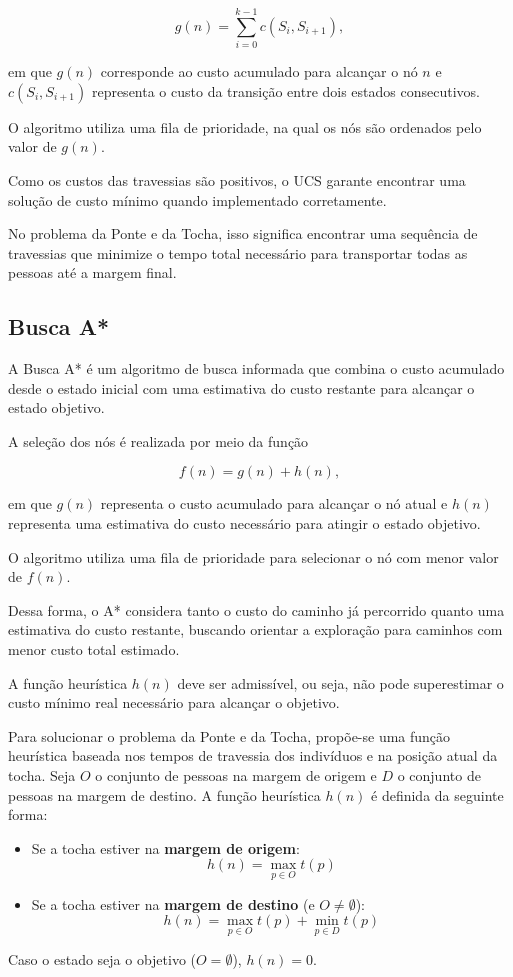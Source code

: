 \documentclass{article}
\begin{document}
\[
g(n)=\sum_{i=0}^{k-1}c(S_i,S_{i+1}),
\]

em que $g(n)$ corresponde ao custo acumulado
para alcançar o nó $n$ e $c(S_i,S_{i+1})$
representa o custo da transição entre dois
estados consecutivos.

O algoritmo utiliza uma fila de prioridade,
na qual os nós são ordenados pelo valor
de $g(n)$.

Como os custos das travessias são positivos,
o UCS garante encontrar uma solução de custo
mínimo quando implementado corretamente.

No problema da Ponte e da Tocha, isso significa
encontrar uma sequência de travessias que minimize
o tempo total necessário para transportar todas
as pessoas até a margem final.

\subsection{Busca A*}

A Busca A* é um algoritmo de busca informada que
combina o custo acumulado desde o estado inicial
com uma estimativa do custo restante para alcançar
o estado objetivo.

A seleção dos nós é realizada por meio da função

\[
f(n)=g(n)+h(n),
\]

em que $g(n)$ representa o custo acumulado para
alcançar o nó atual e $h(n)$ representa uma
estimativa do custo necessário para atingir
o estado objetivo.

O algoritmo utiliza uma fila de prioridade
para selecionar o nó com menor valor de $f(n)$.

Dessa forma, o A* considera tanto o custo
do caminho já percorrido quanto uma estimativa
do custo restante, buscando orientar a exploração
para caminhos com menor custo total estimado.

A função heurística $h(n)$ deve ser admissível,
ou seja, não pode superestimar o custo mínimo
real necessário para alcançar o objetivo.

Para solucionar o problema da Ponte e da Tocha, 
propõe-se uma função heurística baseada nos tempos de 
travessia dos indivíduos e na posição atual da tocha. 
Seja $O$ o conjunto de pessoas na margem de origem e $D$ 
o conjunto de pessoas na margem de destino. A função heurística 
$h(n)$ é definida da seguinte forma:

\begin{itemize}
    \item Se a tocha estiver na \textbf{margem de origem}:
    \[
    h(n) = \max_{p \in O} t(p)
    \]
    \item Se a tocha estiver na \textbf{margem de destino} (e $O \neq \emptyset$):
    \[
    h(n) = \max_{p \in O} t(p) + \min_{p \in D} t(p)
    \]
\end{itemize}
Caso o estado seja o objetivo ($O = \emptyset$), $h(n) = 0$.
\end{document}
